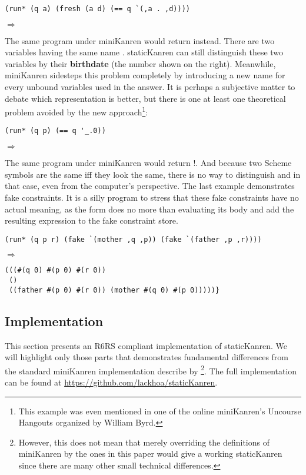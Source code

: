 \begin{lstlisting}
(run* (q a) (fresh (a d) (== q `(,a . ,d))))
\end{lstlisting}
$\Rightarrow$ 

The same program under miniKanren would return  instead. There are two variables having the same name . staticKanren can still distinguish these two variables by their \textbf{birthdate} (the number shown on the right). Meanwhile, miniKanren sidesteps this problem completely by introducing a new name for every unbound variables used in the answer. It is perhaps a subjective matter to debate which representation is better, but there is one at least one theoretical problem avoided by the new approach\footnote{This example was even mentioned in one of the online miniKanren's Uncourse Hangouts organized by William Byrd.}:

\begin{lstlisting}
(run* (q p) (== q '_.0))
\end{lstlisting}
$\Rightarrow$ 

The same program under miniKanren would return !. And because two Scheme symbols are the same iff they look the same, there is no way to distinguish  and  in that case, even from the computer's perspective. The last example demonstrates fake constraints. It is a silly program to stress that these fake constraints have no actual meaning, as the  form does no more than evaluating its body and add the resulting expression to the fake constraint store.
\begin{lstlisting}
(run* (q p r) (fake `(mother ,q ,p)) (fake `(father ,p ,r))))
\end{lstlisting}

$\Rightarrow$
\begin{lstlisting}
(((#(q 0) #(p 0) #(r 0))
 ()
 ((father #(p 0) #(r 0)) (mother #(q 0) #(p 0)))))}
\end{lstlisting}



\subsection{Implementation}\label{static_imp}
This section presents an R6RS compliant implementation of staticKanren. We will highlight only those parts that demonstrates fundamental differences from the standard miniKanren implementation describe by \textcite{byrdphd}\footnote{However, this does not mean that merely overriding the definitions of miniKanren by the ones in this paper would give a working staticKanren since there are many other small technical differences.}. The full implementation can be found at \url{https://github.com/lackhoa/staticKanren}.

